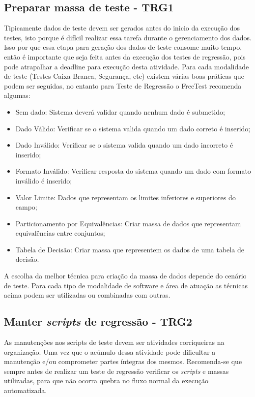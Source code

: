 \subsection{Preparar massa de teste - TRG1}
\label{sec:guiatrg1}

Tipicamente dados de teste devem ser gerados antes do inicio da execução dos testes, isto porque é difícil realizar essa tarefa durante o gerenciamento dos dados. Isso por que essa etapa para geração dos dados de teste consome muito tempo, então é importante que seja feita antes da execução dos testes de regressão, pois pode atrapalhar a deadline para execução desta atividade. Para cada modalidade de teste (Testes Caixa Branca, Segurança, etc) existem várias boas práticas que podem ser seguidas, no entanto para Teste de Regressão o FreeTest recomenda algumas:

\begin{itemize}
    \item Sem dado: Sistema deverá validar quando nenhum dado é submetido;
    \item Dado Válido: Verificar se o sistema valida quando um dado correto é inserido;
    \item Dado Inválido: Verificar se o sistema valida quando um dado incorreto é inserido;
    \item Formato Inválido: Verificar resposta do sistema quando um dado com formato inválido é inserido;
    \item Valor Limite: Dados que representam os limites inferiores e superiores do campo;
    \item Particionamento por Equivalências: Criar massa de dados que representam equivalências entre conjuntos;
    \item Tabela de Decisão: Criar massa que representem os dados de uma tabela de decisão.
\end{itemize}

A escolha da melhor técnica para criação da massa de dados depende do cenário de teste. Para cada tipo de modalidade de software e área de atuação as técnicas acima podem ser utilizadas ou combinadas com outras.

\subsection{Manter \textit{scripts} de regressão - TRG2}
\label{sec:guiatrg2}

As manutenções nos scripts de teste devem ser atividades corriqueiras na organização. Uma vez que o acúmulo dessa atividade pode dificultar a manutenção e/ou comprometer partes íntegras dos mesmos. Recomenda-se que sempre antes de realizar um teste de regressão verificar os \textit{scripts} e massas utilizadas, para que não ocorra quebra no fluxo normal da execução automatizada.

